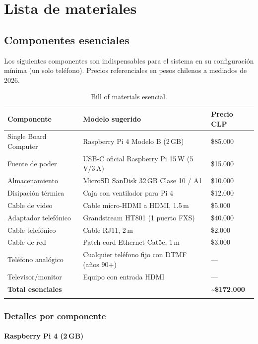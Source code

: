 \chapter{Lista de materiales}

\section{Componentes esenciales}

Los siguientes componentes son indispensables para el sistema en su configuración mínima (un solo teléfono). Precios referenciales en pesos chilenos a mediados de 2026.

\begin{longtable}{p{} p{} R{0.18\textwidth}}
\toprule
\textbf{Componente} & \textbf{Modelo sugerido} & \textbf{Precio CLP} \\
\midrule
\endhead
Single Board Computer & Raspberry Pi 4 Modelo B (2\,GB) & \$85.000 \\
Fuente de poder & USB-C oficial Raspberry Pi 15\,W (5\,V/3\,A) & \$15.000 \\
Almacenamiento & MicroSD SanDisk 32\,GB Clase 10 / A1 & \$10.000 \\
Disipación térmica & Caja con ventilador para Pi 4 & \$12.000 \\
Cable de video & Cable micro-HDMI a HDMI, 1.5\,m & \$5.000 \\
Adaptador telefónico & Grandstream HT801 (1 puerto FXS) & \$40.000 \\
Cable telefónico & Cable RJ11, 2\,m & \$2.000 \\
Cable de red & Patch cord Ethernet Cat5e, 1\,m & \$3.000 \\
Teléfono analógico & Cualquier teléfono fijo con DTMF (años 90+) & --- \\
Televisor/monitor & Equipo con entrada HDMI & --- \\
\midrule
\textbf{Total esenciales} & & \textbf{\textasciitilde\$172.000} \\
\bottomrule
\caption{Bill of materials esencial.}\\
\end{longtable}

\subsection{Detalles por componente}

\subsubsection{Raspberry Pi 4 (2\,GB)}

